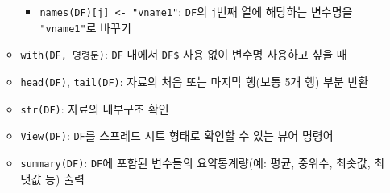 \documentclass[11pt,a4paper]{book}
\providecommand{\tightlist}{%
  \setlength{\itemsep}{0pt}\setlength{\parskip}{0pt}}
\theoremstyle{definition}
\theoremstyle{definition}
\theoremstyle{definition}
\theoremstyle{remark}
\begin{document}
\begin{itemize}
\begin{itemize}
    \begin{itemize}
    \tightlist
    \item
      \texttt{names(DF){[}j{]}\ \textless{}-\ "vname1"}: \texttt{DF}의
      \texttt{j}번째 열에 해당하는 변수명을 \texttt{"vname1"}로 바꾸기
    \end{itemize}
  \item
    \texttt{with(DF,\ 명령문)}: \texttt{DF} 내에서 \texttt{DF\$} 사용
    없이 변수명 사용하고 싶을 때
  \item
    \texttt{head(DF)}, \texttt{tail(DF)}: 자료의 처음 또는 마지막
    행(보통 5개 행) 부분 반환
  \item
    \texttt{str(DF)}: 자료의 내부구조 확인
  \item
    \texttt{View(DF)}: \texttt{DF}를 스프레드 시트 형태로 확인할 수 있는
    뷰어 명령어
  \item
    \texttt{summary(DF)}: \texttt{DF}에 포함된 변수들의 요약통계량(예:
    평균, 중위수, 최솟값, 최댓값 등) 출력
  \end{itemize}
\end{itemize}

\footnotesize
\end{document}
